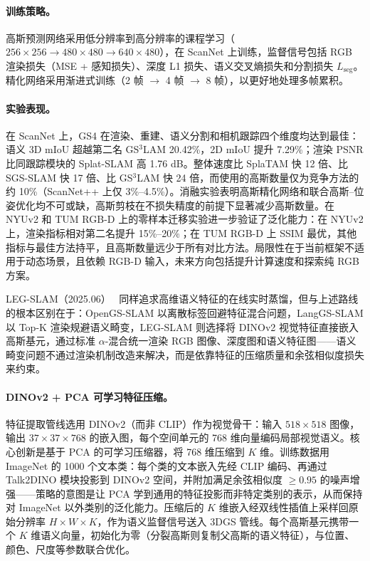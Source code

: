 \paragraph{训练策略。}
高斯预测网络采用低分辨率到高分辨率的课程学习（$256\!\times\!256 \to 480\!\times\!480 \to 640\!\times\!480$），在 ScanNet 上训练，监督信号包括 RGB 渲染损失（MSE + 感知损失）、深度 L1 损失、语义交叉熵损失和分割损失 $L_{\text{seg}}$。精化网络采用渐进式训练（2 帧 $\to$ 4 帧 $\to$ 8 帧），以更好地处理多帧累积。

\paragraph{实验表现。}
在 ScanNet 上，GS4 在渲染、重建、语义分割和相机跟踪四个维度均达到最佳：语义 3D mIoU 超越第二名 GS$^3$LAM 20.42\%，2D mIoU 提升 7.29\%；渲染 PSNR 比同跟踪模块的 Splat-SLAM 高 1.76 dB。整体速度比 SplaTAM 快 12 倍、比 SGS-SLAM 快 17 倍、比 GS$^3$LAM 快 24 倍，而使用的高斯数量仅为竞争方法的约 10\%（ScanNet++ 上仅 3\%--4.5\%）。消融实验表明高斯精化网络和联合高斯--位姿优化均不可或缺，高斯剪枝在不损失精度的前提下显著减少高斯数量。在 NYUv2 和 TUM RGB-D 上的零样本迁移实验进一步验证了泛化能力：在 NYUv2 上，渲染指标相对第二名提升 15\%--20\%；在 TUM RGB-D 上 SSIM 最优，其他指标与最佳方法持平，且高斯数量远少于所有对比方法。局限性在于当前框架不适用于动态场景，且依赖 RGB-D 输入，未来方向包括提升计算速度和探索纯 RGB 方案。

LEG-SLAM（2025.06）~\cite{2506_03073} 同样追求高维语义特征的在线实时蒸馏，但与上述路线的根本区别在于：OpenGS-SLAM 以离散标签回避特征混合问题，LangGS-SLAM 以 Top-K 渲染规避语义畸变，LEG-SLAM 则选择将 DINOv2 视觉特征直接嵌入高斯基元，通过标准 $\alpha$-混合统一渲染 RGB 图像、深度图和语义特征图——语义畸变问题不通过渲染机制改造来解决，而是依靠特征的压缩质量和余弦相似度损失来约束。

\paragraph{DINOv2 + PCA 可学习特征压缩。}
特征提取管线选用 DINOv2（而非 CLIP）作为视觉骨干：输入 $518 \times 518$ 图像，输出 $37 \times 37 \times 768$ 的嵌入图，每个空间单元的 768 维向量编码局部视觉语义。核心创新是基于 PCA 的可学习压缩器，将 768 维压缩到 $K$ 维。训练数据用 ImageNet 的 1000 个文本类：每个类的文本嵌入先经 CLIP 编码、再通过 Talk2DINO 模块投影到 DINOv2 空间，并附加满足余弦相似度 $\geq 0.95$ 的噪声增强——策略的意图是让 PCA 学到通用的特征投影而非特定类别的表示，从而保持对 ImageNet 以外类别的泛化能力。压缩后的 $K$ 维嵌入经双线性插值上采样回原始分辨率 $H \times W \times K$，作为语义监督信号送入 3DGS 管线。每个高斯基元携带一个 $K$ 维语义向量，初始化为零（分裂高斯则复制父高斯的语义特征），与位置、颜色、尺度等参数联合优化。

